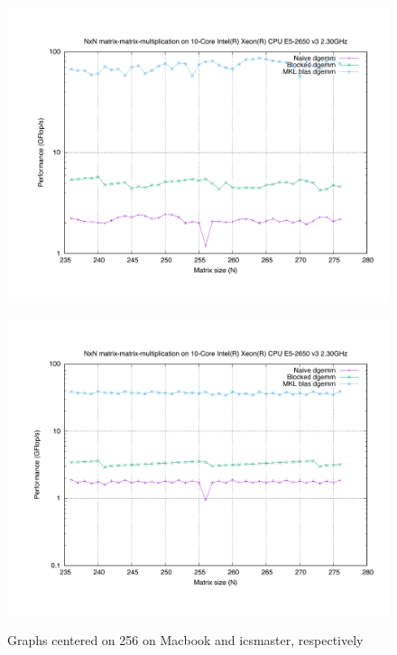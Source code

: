 \documentclass[unicode,11pt,a4paper,oneside,numbers=endperiod,openany]{scrartcl}
\begin{document}
\begin{enumerate}
            \begin{figure}[H]
                \begin{minipage}{.5\textwidth}
                    \centering
                    \includegraphics[width=\linewidth]{256_mac}
                    \label{c256_mac}
                \end{minipage}%
                \begin{minipage}{.5\textwidth}
                    \centering
                    \includegraphics[width=\linewidth]{256_icsmaster} 
                    \label{c256_icsmaster}
                \end{minipage}
                \caption{Graphs centered on 256 on Macbook and icsmaster, respectively}
                \label{c256}
            \end{figure}



\end{enumerate}
\end{document}
